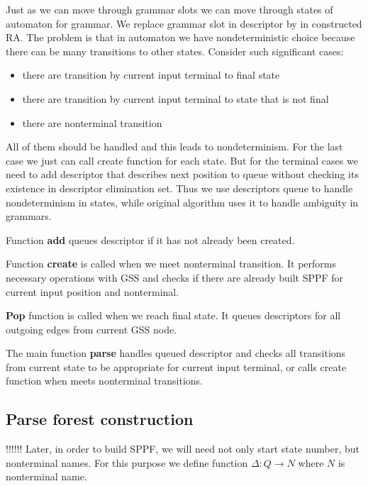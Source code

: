 \documentclass[runningheads,a4paper]{llncs}
\begin{document}
Just as we can move through grammar slots we can move through states of automaton for grammar.
We replace grammar slot in descriptor by in constructed RA.
The problem is that in automaton we have nondeterministic choice because there can be many transitions to other states.
Consider such significant cases:

\begin{itemize} 
\item there are transition by current input terminal to final state
\item there are transition by current input terminal to state that is not final
\item there are nonterminal transition
\end{itemize}

All of them should be handled and this leads to nondeterminism. 
For the last case we just can call create function for each state.
But for the terminal cases we need to add descriptor that describes next position to queue without checking its existence in descriptor elimination set.
Thus we use descriptors queue to handle nondeterminism in states, while original algorithm uses it to handle ambiguity in grammars.



Function \textbf{add} queues descriptor if it has not already been created.



Function \textbf{create} is called when we meet nonterminal transition.
It performs necessary operations with GSS and checks if there are already built SPPF for current
input position and nonterminal.



\textbf{Pop} function is called when we reach final state. It queues descriptors for all outgoing edges from current GSS node.



The main function \textbf{parse} handles queued descriptor and checks all transitions from current state to be appropriate
for current input terminal, or calls create function when meets nonterminal transitions.


\subsection{Parse forest construction}
!!!!!!
Later, in order to build SPPF, we will need not only start state number, but nonterminal names.
For this purpose we define function $\Delta : Q \to N$ where $N$ is nonterminal name.
\end{document}
